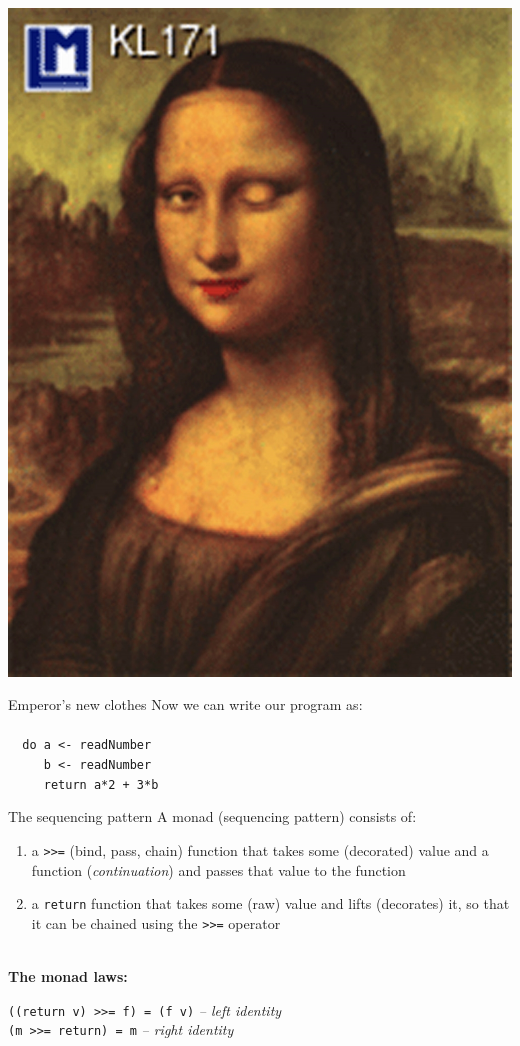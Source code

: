 \documentclass{beamer}
\begin{document}
\begin{frame}
  \includegraphics[height=\textheight]{monada.jpg}  
\end{frame}

\begin{frame}{Emperor's new clothes}
  Now we can write our program as: \\
  \texttt{ \\
    \ \ do a <- readNumber\\
    \ \ \ \ \ b <- readNumber \\
    \ \ \ \ \ return a*2 + 3*b
  }
\end{frame}

\begin{frame}{The sequencing pattern} \pause
  A monad (sequencing pattern) consists of: \pause
  \begin{enumerate}
  \item a \texttt{>>=} (bind, pass, chain) function
    that takes some (decorated) value and a function (\textit{continuation}) and
    passes that value to the function \pause
  \item a \texttt{return} function that takes some
    (raw) value and lifts (decorates) it, so that it
    can be chained using the \texttt{>>=} operator \pause
  \end{enumerate}
  \ \\ \textbf{The monad laws:} \pause
 
  \texttt{((return v) >>= f) = (f v)} \pause \textit{-- left identity} \\ \pause
  \texttt{(m >>= return) = m} \pause \textit{-- right identity}
\end{frame}
\end{document}
